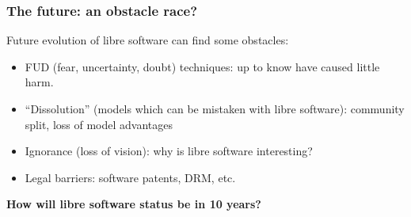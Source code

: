 
\begin{frame}
  \frametitle{The future: an obstacle race?}

  Future evolution of libre software can find some obstacles:

  \begin{itemize}
  \item FUD (fear, uncertainty, doubt) techniques: up to know have
    caused little harm.
  \item ``Dissolution'' (models which can be mistaken with libre
    software): community split, loss of model advantages
  \item Ignorance (loss of vision): why is libre software interesting?
  \item Legal barriers: software patents, DRM, etc.
  \end{itemize}

\end{frame}


\begin{frame}

  \begin{center}
  {\LARGE \bf How will libre software status be in 10 years?}
  \end{center}

\end{frame}

